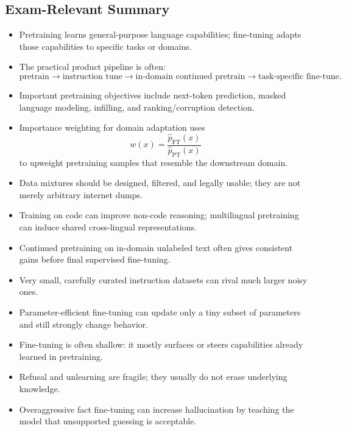\documentclass[11pt]{article}
\begin{document}
\subsection{Exam-Relevant Summary}
\begin{itemize}
    \item Pretraining learns general-purpose language capabilities; fine-tuning adapts those capabilities to specific tasks or domains.
    \item The practical product pipeline is often:
    \[
    \text{pretrain} \rightarrow \text{instruction tune} \rightarrow \text{in-domain continued pretrain} \rightarrow \text{task-specific fine-tune}.
    \]
    \item Important pretraining objectives include next-token prediction, masked language modeling, infilling, and ranking/corruption detection.
    \item Importance weighting for domain adaptation uses
    \[
    w(x)=\frac{\hat{p}_{\mathrm{FT}}(x)}{\hat{p}_{\mathrm{PT}}(x)}
    \]
    to upweight pretraining samples that resemble the downstream domain.
    \item Data mixtures should be designed, filtered, and legally usable; they are not merely arbitrary internet dumps.
    \item Training on code can improve non-code reasoning; multilingual pretraining can induce shared cross-lingual representations.
    \item Continued pretraining on in-domain unlabeled text often gives consistent gains before final supervised fine-tuning.
    \item Very small, carefully curated instruction datasets can rival much larger noisy ones.
    \item Parameter-efficient fine-tuning can update only a tiny subset of parameters and still strongly change behavior.
    \item Fine-tuning is often shallow: it mostly surfaces or steers capabilities already learned in pretraining.
    \item Refusal and unlearning are fragile; they usually do not erase underlying knowledge.
    \item Overaggressive fact fine-tuning can increase hallucination by teaching the model that unsupported guessing is acceptable.
\end{itemize}
\end{document}
